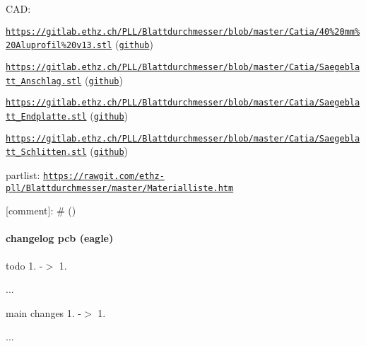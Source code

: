 C\-A\-D\-:
\begin{DoxyItemize}
\item \href{https://gitlab.ethz.ch/PLL/Blattdurchmesser/blob/master/Catia/40%20mm%20Aluprofil%20v13.stl}{\tt https\-://gitlab.\-ethz.\-ch/\-P\-L\-L/\-Blattdurchmesser/blob/master/\-Catia/40\%20mm\%20\-Aluprofil\%20v13.\-stl} (\href{https://github.com/ethz-pll/Blattdurchmesser/blob/master/Catia/40%20mm%20Aluprofil%20v13.stl}{\tt github})
\item \href{https://gitlab.ethz.ch/PLL/Blattdurchmesser/blob/master/Catia/Saegeblatt_Anschlag.stl}{\tt https\-://gitlab.\-ethz.\-ch/\-P\-L\-L/\-Blattdurchmesser/blob/master/\-Catia/\-Saegeblatt\-\_\-\-Anschlag.\-stl} (\href{https://github.com/ethz-pll/Blattdurchmesser/blob/master/Catia/Saegeblatt_Anschlag.stl}{\tt github})
\item \href{https://gitlab.ethz.ch/PLL/Blattdurchmesser/blob/master/Catia/Saegeblatt_Endplatte.stl}{\tt https\-://gitlab.\-ethz.\-ch/\-P\-L\-L/\-Blattdurchmesser/blob/master/\-Catia/\-Saegeblatt\-\_\-\-Endplatte.\-stl} (\href{https://github.com/ethz-pll/Blattdurchmesser/blob/master/Catia/Saegeblatt_Endplatte.stl}{\tt github})
\item \href{https://gitlab.ethz.ch/PLL/Blattdurchmesser/blob/master/Catia/Saegeblatt_Schlitten.stl}{\tt https\-://gitlab.\-ethz.\-ch/\-P\-L\-L/\-Blattdurchmesser/blob/master/\-Catia/\-Saegeblatt\-\_\-\-Schlitten.\-stl} (\href{https://github.com/ethz-pll/Blattdurchmesser/blob/master/Catia/Saegeblatt_Schlitten.stl}{\tt github})
\end{DoxyItemize}

partlist\-: \href{https://rawgit.com/ethz-pll/Blattdurchmesser/master/Materialliste.htm}{\tt https\-://rawgit.\-com/ethz-\/pll/\-Blattdurchmesser/master/\-Materialliste.\-htm}

\mbox{[}comment\mbox{]}\-: \# ()

\paragraph*{changelog pcb (eagle)}

todo 1. -\/$>$ 1.


\begin{DoxyItemize}
\item ...
\end{DoxyItemize}

main changes 1. -\/$>$ 1.


\begin{DoxyItemize}
\item ...
\end{DoxyItemize}

